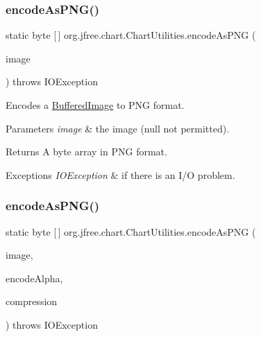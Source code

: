 \subsubsection{\texorpdfstring{encode\+As\+P\+N\+G()}{encodeAsPNG()}\hspace{0.1cm}{\footnotesize\ttfamily [1/2]}}
{\footnotesize\ttfamily static byte \mbox{[}$\,$\mbox{]} org.\+jfree.\+chart.\+Chart\+Utilities.\+encode\+As\+P\+NG (\begin{DoxyParamCaption}\item[{Buffered\+Image}]{image }\end{DoxyParamCaption}) throws I\+O\+Exception\hspace{0.3cm}{\ttfamily [static]}}

Encodes a \mbox{\hyperlink{}{Buffered\+Image}} to P\+NG format.


\begin{DoxyParams}{Parameters}
{\em image} & the image ({\ttfamily null} not permitted).\\
\hline
\end{DoxyParams}
\begin{DoxyReturn}{Returns}
A byte array in P\+NG format.
\end{DoxyReturn}

\begin{DoxyExceptions}{Exceptions}
{\em I\+O\+Exception} & if there is an I/O problem. \\
\hline
\end{DoxyExceptions}
\mbox{\label{classorg_1_1jfree_1_1chart_1_1_chart_utilities_a8532e79d6a3348f62234a8410339057b}} 
\subsubsection{\texorpdfstring{encode\+As\+P\+N\+G()}{encodeAsPNG()}\hspace{0.1cm}{\footnotesize\ttfamily [2/2]}}
{\footnotesize\ttfamily static byte \mbox{[}$\,$\mbox{]} org.\+jfree.\+chart.\+Chart\+Utilities.\+encode\+As\+P\+NG (\begin{DoxyParamCaption}\item[{Buffered\+Image}]{image,  }\item[{boolean}]{encode\+Alpha,  }\item[{int}]{compression }\end{DoxyParamCaption}) throws I\+O\+Exception\hspace{0.3cm}{\ttfamily [static]}}


